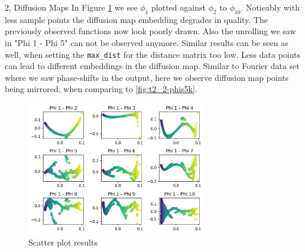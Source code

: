 \begin{task}{2, Diffusion Maps}
In Figure \ref{fig:t2_2-phis1k} we see $\phi_1$ plotted against $\phi_2$ to $\phi_{10}$. Notieably with less sample points the diffusion map embedding degrades in quality. The previously observed functions now look poorly drawn. Also the unrolling we saw in "Phi 1 - Phi 5" can not be observed anymore. Similar results can be seen as well, when setting the \verb|max_dist| for the distance matrix too low. Less data points can lead to different embeddings in the diffusion map. Similar to Fourier data set where we saw phase-shifts in the output, here we observe diffusion map points being mirrored, when comparing to \ref{fig:t2_2-phis5k}.
\begin{figure}[H]
\centering
\includegraphics[width=0.7\textwidth]{images_task2/t2_2-scatterplot1k.png}
\caption{Scatter plot results}
\label{fig:t2_2-phis1k}
\end{figure}


\end{task}
